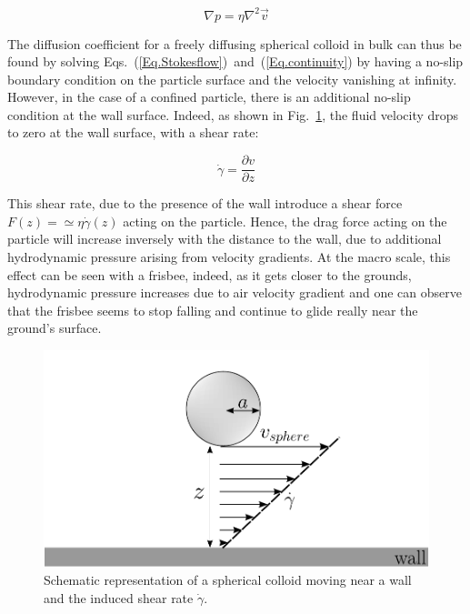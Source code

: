 \begin{equation}
	\nabla p = \eta \nabla ^2 \vec{v}
	\label{Eq.Stokesflow}
\end{equation}

The diffusion coefficient for a freely diffusing spherical colloid in bulk can thus be found by solving Eqs.~(\ref{Eq.Stokesflow})~and~(\ref{Eq.continuity}) by having a no-slip boundary condition on the particle surface and the velocity vanishing at infinity. However, in the case of a confined particle, there is an additional no-slip condition at the wall surface. Indeed, as shown in Fig.~\ref{fig.shear}, the fluid velocity drops to zero at the wall surface, with a shear rate:

\begin{equation}
	\dot{\gamma} = \frac{\partial v}{\partial z}
\end{equation} 

This shear rate, due to the presence of the wall introduce a shear force $F(z) = \simeq \eta \dot{\gamma} (z) $ acting on the particle. Hence, the drag force acting on the particle will increase inversely with the distance to the wall, due to additional hydrodynamic pressure arising from velocity gradients. At the macro scale, this effect can be seen with a frisbee, indeed, as it gets closer to the grounds, hydrodynamic pressure increases due to air velocity gradient and one can observe that the frisbee seems to stop falling and continue to glide really near the ground's surface.

\begin{figure}[ht]
	\centering
	\includegraphics{02_body/chapter3/images/draw_shear/shear.pdf}
	\caption{Schematic representation of a spherical colloid moving near a wall and the induced shear rate $\dot{\gamma}$.} 
	\label{fig.shear}
\end{figure}

